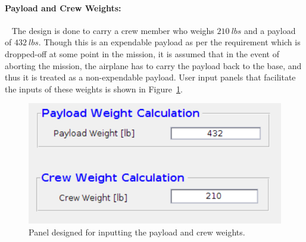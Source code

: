 \documentclass[pdftex,11pt,letter]{article}
\begin{document}
\paragraph{Payload and Crew Weights:}~ The design is done to carry a crew member who weighs $210~lbs$ and  a payload of $432~lbs$. Though this is an expendable payload as per the requirement which is dropped-off at some point in the mission, it is assumed that in the event of aborting the mission, the airplane has to carry the payload back to the base, and thus it is treated as a non-expendable payload. User input panels that facilitate the inputs of these weights is shown  in Figure~\ref{payload_crew_weight_panel}.
\begin{figure}[h!]
	\centering
	\includegraphics[scale=0.5]{figures/payload_crew_weight_panel.pdf}
	\caption{Panel designed for inputting the payload and crew weights.}
	\label{payload_crew_weight_panel}
\end{figure}
\end{document}

